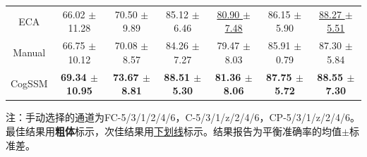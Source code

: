 \begin{table}[htbp]
{\begin{tabular}{ccccccc}
ECA & 66.02 $\pm$ 11.28 & 70.50 $\pm$ 9.89 & 85.12 $\pm$ 6.46 & \uline{80.90 $\pm$ 7.48} & 86.15 $\pm$ 5.90 & \uline{88.27 $\pm$ 5.51} \\
Manual & 66.75 $\pm$ 10.12 & 70.08 $\pm$ 8.57 & 84.26 $\pm$ 7.27 & 79.47 $\pm$ 8.03 & 85.91 $\pm$ 0.79 & 87.30 $\pm$ 5.84 \\
CogSSM & \textbf{69.34 $\pm$ 10.95} & \textbf{73.67 $\pm$ 8.81} & \textbf{88.51 $\pm$ 5.30} & \textbf{81.36 $\pm$ 8.06} & \textbf{87.75 $\pm$ 5.72} & \textbf{88.55 $\pm$ 7.30} \\ 
\bottomrule
\end{tabular}
}
\begin{tablenotes}
\footnotesize
\item[]\centering 注：手动选择的通道为FC-5/3/1/2/4/6，C-5/3/1/z/2/4/6，CP-5/3/1/z/2/4/6。最佳结果用\textbf{粗体}标示，次佳结果用\underline{下划线}标示。结果报告为平衡准确率的均值$\pm$标准差。
\end{tablenotes}
\label{tab:4-2}
\end{table}

